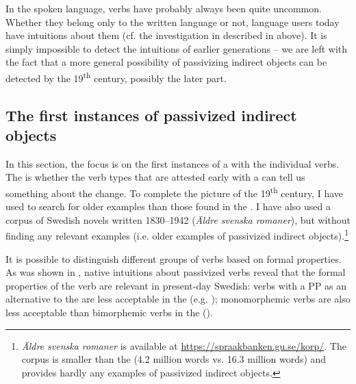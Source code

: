 \documentclass[output=paper]{langscibook}
\begin{document}
In the spoken language,  verbs have probably always been quite uncommon. Whether they belong only to the written language or not, language users today have intuitions about them (cf. the investigation in \citealt{HaddicanHolmberg2019} described in  above). It is simply impossible to detect the intuitions of earlier generations – we are left with the fact that a more general possibility of passivizing indirect objects can be detected by the 19\textsuperscript{th} century, possibly the later part.


\subsection{The first instances of passivized indirect objects}\label{sec:falk:3.7}\largerpage


In this section, the focus is on the first instances of a  with the individual verbs. The  is whether the verb types that are attested early with a  can tell us something about the change. To complete the picture of the 19\textsuperscript{th} century, I have used  to search for older examples than those found in the . I have also used a corpus of Swedish novels written 1830–1942 (\textit{Äldre svenska romaner}), but without finding any relevant examples (i.e. older examples of passivized indirect objects).\footnote{\textit{Äldre svenska romaner} is available at \url{https://spraakbanken.gu.se/korp/}. The corpus is smaller than the  (4.2 million words vs. 16.3 million words) and provides hardly any examples of passivized indirect objects.}


It is possible to distinguish different groups of verbs based on formal properties. As was shown in , native  intuitions about passivized  verbs reveal that the formal properties of the verb are relevant in present-day Swedish: verbs with a PP as an alternative to the  are less acceptable in the  (e.g. \citealt{Anward1989}); monomorphemic verbs are also less acceptable than bimorphemic verbs in the  (\citealt{HolmbergPlatzack1995,HaddicanHolmberg2019}).
\end{document}
